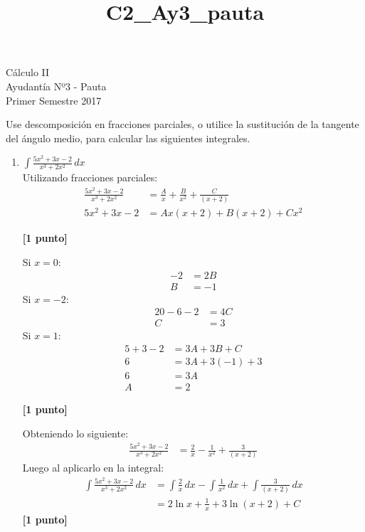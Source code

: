 \documentclass[a4paper,10pt]{article}
\title{C2_Ay3_pauta}
\newcommand{\dis}{\displaystyle}
\begin{document}
\begin{center}
Cálculo II\\
Ayudantía Nº3 - Pauta\\
Primer Semestre 2017
\end{center}

Use descomposici\'{o}n en fracciones parciales, o utilice la sustitución de la tangente del ángulo medio, para calcular las siguientes integrales.


\begin{enumerate}
\item $\dis \int \frac{5x^2+3x-2}{x^3+2x^2}\, dx$\\

Utilizando fracciones parciales:
\begin{align*}
 \dis  \frac{5x^2+3x-2}{x^3+2x^2}  &=  \dis  \frac{A}{x} + \dis  \frac{B}{x^2} + \dis  \frac{C}{(x+2)}  \\
 \dis  5x^2+3x-2  &=  \dis  Ax(x+2)+ \dis  B(x+2) + \dis  Cx^2
\end{align*}

\dotfill \textbf{[1 punto]}

Si $x=0$:
\begin{align*}
 \dis -2  &=  \dis  2B \\
 \dis B  &=  \dis  -1
\end{align*}
Si $x=-2$:
\begin{align*}
 \dis 20-6-2  &=  \dis 4C \\
 \dis C  &=  \dis  3
\end{align*}
Si $x=1$:
\begin{align*}
 \dis 5+3-2  &=  \dis 3A+3B+C \\
 \dis 6  &=  \dis 3A+3(-1)+3\\
 \dis 6  &=  \dis 3A\\
 \dis A  &=  \dis 2
\end{align*}

\dotfill \textbf{[1 punto]}

Obteniendo lo siguiente:
\begin{align*}
 \dis  \frac{5x^2+3x-2}{x^3+2x^2}  &=  \dis  \frac{2}{x} - \dis  \frac{1}{x^2} + \dis  \frac{3}{(x+2)}
\end{align*}
Luego al aplicarlo en la integral:
\begin{align*}
 \dis  \int \frac{5x^2+3x-2}{x^3+2x^2}\, dx  &=  \dis \int \frac{2}{x}\, dx - \dis \int \frac{1}{x^2}\, dx + \dis \int \frac{3}{(x+2)}\, dx   \\
  &=  \dis 2 \ln x + \dis  \frac{1}{x} + \dis 3 \ln (x+2) + C
\end{align*}
\dotfill \textbf{[1 punto]}
\newpage







\end{enumerate}
\end{document}
